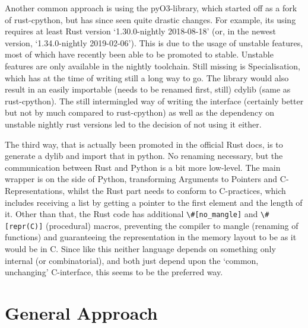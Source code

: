 Another common approach is using the pyO3-library, which started off as a fork
of rust-cpython, but has since seen quite drastic changes. For example, its
using requires at least Rust version ‘1.30.0-nightly 2018-08-18’ (or, in the
newest version, ‘1.34.0-nightly 2019-02-06’). This is due to the usage of
unstable features, most of which have recently been able to be promoted to
stable. Unstable features are only available in the nightly toolchain.  Still
missing is Specialisation, which has at the time of writing still a long way to
go.  The library would also result in an easily importable (needs to be renamed
first, still) cdylib (same as rust-cpython). The still intermingled way of
writing the interface (certainly better but not by much compared to
rust-cpython) as well as the dependency on unstable nightly rust versions led
to the decision of not using it either.

The third way, that is actually been promoted in the official Rust docs, is to
generate a dylib and import that in python. No renaming necessary, but the
communication between Rust and Python is a bit more low-level. The main wrapper
is on the side of Python, transforming Arguments to Pointers and
C-Representations, whilst the Rust part needs to conform to C-practices, which
includes receiving a list by getting a pointer to the first element and the
length of it. Other than that, the Rust code has additional
\verb!\#[no_mangle]! and \verb!\#[repr(C)]!  (procedural) macros, preventing
the compiler to mangle (renaming of functions) and guaranteeing the
representation in the memory layout to be as it would be in C. Since like this
neither language depends on something only internal (or combinatorial), and
both just depend upon the ‘common, unchanging’ C-interface, this seems to be
the preferred way.


\newpage
\section{General Approach}\label{sec:approach}




